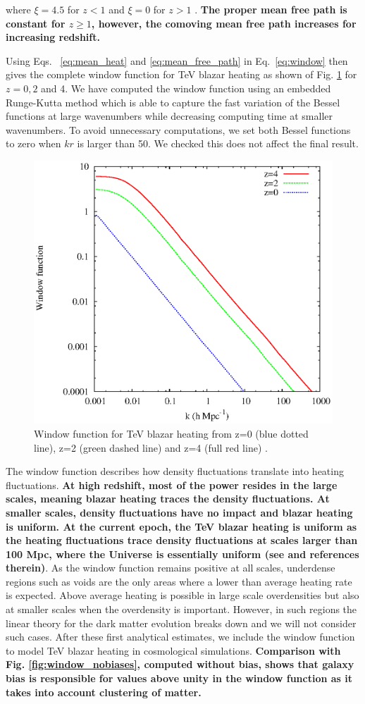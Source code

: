\documentclass[twocolumns]{emulateapj}
\newcommand\ALc[1]{{\color{red} \bf #1}} %
\begin{document}
where $\xi=4.5$ for $z<1$ and $\xi=0$ for $z>1$ \citep{2004A&A...413..807K,2009PhRvD..80l3012N}. \ALc{The proper mean free path is constant for $z\geq 1$, however, the comoving mean free path increases for increasing redshift.}

Using Eqs. ~\ref{eq:mean_heat} and \ref{eq:mean_free_path} in Eq.~\ref{eq:window} then gives the complete window function for TeV blazar heating as shown of Fig. \ref{fig:window} for $z=0,2$ and 4. We have computed the window function using an embedded Runge-Kutta method which is able to capture the fast variation of the Bessel functions at large wavenumbers while decreasing computing time at smaller wavenumbers. To avoid unnecessary computations, we set both Bessel functions to zero when $kr$ is larger than 50. We checked this does not affect the final result.

\begin{figure}[h]
  \centering
  \includegraphics[width = .45\textwidth ]{full_window}
  \caption{Window function for TeV blazar heating from z=0 (blue dotted line), z=2 (green dashed line) and z=4 (full red line) .}
  \label{fig:window}
\end{figure}

The window function describes how density fluctuations translate into heating fluctuations. \ALc{At high redshift, most of the power resides in the large scales, meaning blazar heating traces the density fluctuations. At smaller scales, density fluctuations have no impact and blazar heating is uniform. At the current epoch,  the TeV blazar heating is uniform as the heating fluctuations trace density fluctuations at scales larger than 100 Mpc, where the Universe is essentially uniform  (see \citet{2013MNRAS.429.2910C} and references therein)}. As the window function remains positive at all scales, underdense regions such as voids are the only areas where a lower than average heating rate is expected. Above average  heating is possible in large scale overdensities but also at  smaller scales when the overdensity is important.  However, in such regions the linear theory for the dark matter evolution breaks down and we will not consider such cases. After these first analytical estimates, we include the window function to model TeV blazar heating in cosmological simulations. \ALc{Comparison with Fig. \ref{fig:window_nobiases}, computed without bias, shows that galaxy bias is responsible for values above unity in the window function as it takes into account clustering of matter.}
\end{document}
